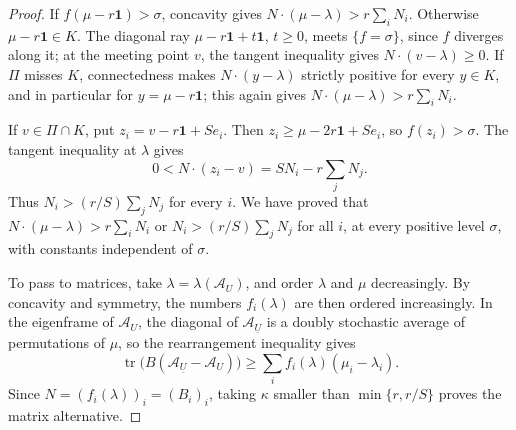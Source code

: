 \begin{proof}
If $f(\mu-r\mathbf1)>\sigma$, concavity gives $N\cdot(\mu-\lambda)>r\sum_iN_i$. Otherwise $\mu-r\mathbf1\in K$. The diagonal ray $\mu-r\mathbf1+t\mathbf1$, $t\geq0$, meets $\{f=\sigma\}$, since $f$ diverges along it; at the meeting point $v$, the tangent inequality gives $N\cdot(v-\lambda)\geq0$. If $\Pi$ misses $K$, connectedness makes $N\cdot(y-\lambda)$ strictly positive for every $y\in K$, and in particular for $y=\mu-r\mathbf1$; this again gives $N\cdot(\mu-\lambda)>r\sum_iN_i$.

If $v\in\Pi\cap K$, put $z_i=v-r\mathbf1+Se_i$. Then $z_i\geq\mu-2r\mathbf1+Se_i$, so $f(z_i)>\sigma$. The tangent inequality at $\lambda$ gives
\[
 0<N\cdot(z_i-v)=SN_i-r\sum_jN_j.
\]
Thus $N_i>(r/S)\sum_jN_j$ for every $i$. We have proved that $N\cdot(\mu-\lambda)>r\sum_iN_i$ or $N_i>(r/S)\sum_jN_j$ for all $i$, at every positive level $\sigma$, with constants independent of $\sigma$.

To pass to matrices, take $\lambda=\lambda(\mathcal A_U)$, and order $\lambda$ and $\mu$ decreasingly. By concavity and symmetry, the numbers $f_i(\lambda)$ are then ordered increasingly. In the eigenframe of $\mathcal A_U$, the diagonal of $\mathcal A_{\underline U}$ is a doubly stochastic average of permutations of $\mu$, so the rearrangement inequality gives
\[
 \operatorname{tr}\bigl(B(\mathcal A_{\underline U}-\mathcal A_U)\bigr)
 \geq\sum_if_i(\lambda)(\mu_i-\lambda_i).
\]
Since $N=(f_i(\lambda))_i=(B_i)_i$, taking $\kappa$ smaller than $\min\{r,r/S\}$ proves the matrix alternative.
\end{proof}

